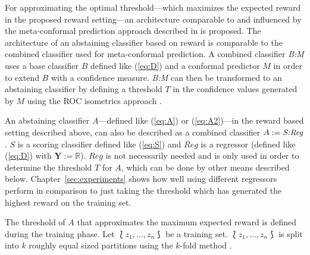 \documentclass[twoside,11pt]{article}
\def\ds{\Lbag z_1,\dots,z_n \Rbag}
\def\Y{\textbf{Y}}
\begin{document}
For approximating the optimal threshold---which maximizes
the expected reward in the proposed reward setting---an
architecture comparable to and influenced by the
meta-confor\-mal prediction approach described in
\citet{smirnov_et_al_2009} is proposed.
The architecture of an abstaining classifier based on
reward is comparable to the combined classifier used for
meta-conformal prediction.
A combined classifier \textit{B:M} uses a base classifier
$B$ defined like (\ref{eq:D}) and a conformal predictor $M$
in order to extend $B$ with a confidence measure.
\textit{B:M} can then be transformed to an abstaining
classifier by defining a threshold $T$ in the confidence
values generated by $M$ using the ROC isometrics approach
\citep[see][]{smirnov_et_al_2009, vanderlooy_et_al_2009,
  fassbender_2019}.

An abstaining classifier $A$---defined like (\ref{eq:A}) or
(\ref{eq:A2})---in the reward based
setting described above, can also be described as a
combined classifier $A := \text{\textit{S:Reg}}$.
$S$ is a scoring classifier defined like (\ref{eq:S}) and
$Reg$ is a regressor (defined like (\ref{eq:D}) with
$\Y := \mathbb{R}$).
$Reg$ is not necessarily needed and is only used in order
to determine the threshold $T$ for $A$, which can be done
by other means described below.
Chapter~\ref{sec:experiments} shows how well using
different regressors perform in comparison to just taking
the threshold which has generated the highest reward on the
training set.

The threshold of $A$ that approximates the maximum expected
reward is defined during the training phase.
Let $\ds$ be a training set.
$\ds$ is split into $k$ roughly equal sized partitions
using the $k$-fold method \citep[see][Chapter 7.10;
Algorithm~\ref{alg:method}, line 2]{hastie_et_al_2009}.
\end{document}
